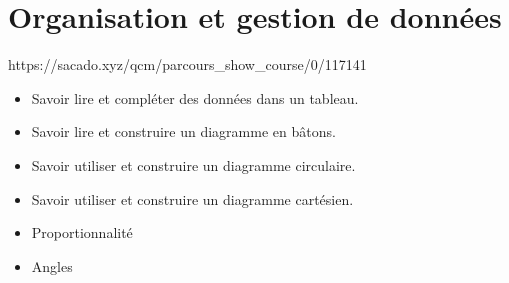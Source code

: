 \chapter{Organisation et gestion de données}
{https://sacado.xyz/qcm/parcours_show_course/0/117141}
{
\begin{CpsCol}
{\LARGE \textbf{\color{sacado_violet}{Les savoir faire ciblés}}}
 \begin{itemize}[leftmargin=*]
 \item Savoir lire et compléter des données dans un tableau.
 \item Savoir lire et construire un diagramme en bâtons.
 \item Savoir utiliser et construire un diagramme circulaire.
 \item Savoir utiliser et construire un diagramme cartésien.
 \end{itemize}
\end{CpsCol}


\begin{CCon}
{\LARGE \textbf{\color{sacado_violet}{Chapitres connexes spiralés}}}
\begin{itemize}[leftmargin=*]
\item Proportionnalité
\item Angles
\end{itemize}
\end{CCon}

}
 
